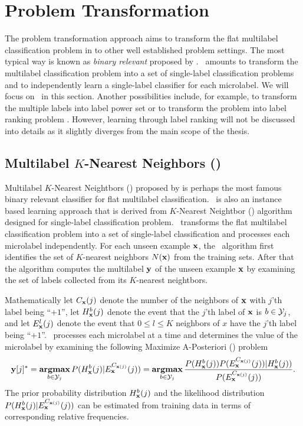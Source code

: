 {%
%
\section{Problem Transformation}

The problem transformation approach aims to transform the flat multilabel classification problem in to other well established problem settings.
The most typical way is known as \textit{binary relevant} proposed by \citet{Tsoumakas07multi,Tsoumakas10mining}.
\br\ amounts to transform the multilabel classification problem into a set of single-label classification problems and to independently learn a single-label classifier for each microlabel.
We will focus on \br\ in this section.
Another possibilities include, for example, to transform the multiple labels into label power set \citep{Tsoumakas07random} or to transform the problem into label ranking problem \citep{Elisseeff01akernel,Brinker07case,Furnkranz08multilabel,Chiang12a}.
However, learning through label ranking will not be discussed into details as it slightly diverges from the main scope of the thesis.



%
%
\subsection{Multilabel $K$-Nearest Neighbors (\mlknn)} \label{sc_mlknn}

Multilabel $K$-Nearest Neightbors (\mlknn) proposed by \citet{Zhang05a,Zhang07mlknn} is perhaps the most famous binary relevant classifier for flat multilabel classification.
\mlknn\ is also an instance based learning approach \citep{Aha91instance} that is derived from $K$-Nearest Neightbor (\knn) algorithm designed for single-label classification problem.
\mlknn\ transforms the flat multilabel classification problem into a set of single-label classification and processes each microlabel independently.
For each unseen example $\mathbf {x}$, the \mlknn\ algorithm first identifies the set of $K$-nearest neighbors $N(\mathbf {x})$ from the training sets.
After that the algorithm computes the multilabel $\mathbf {y}$ of the unseen example $\mathbf {x}$ by examining the set of labels collected from its $K$-nearest neightbors.

Mathematically 
let $C_{\mathbf {x}}(j)$ denote the number of the neighbors of $\mathbf {x}$ with $j$'th label being ``$+1$'',
let $H^b_{\mathbf {x}}(j)$ denote the event that the $j$'th label of $\mathbf {x}$ is $b\in\mathcal{Y}_j$,
and let $E_{\mathbf {x}}^l(j)$ denote the event that $0\le l \le K$ neighbors of $x$ have the $j$'th label being ``$+1$''.
\mlknn\ processes each microlabel at a time and determines the value of the microlabel by examining the following Maximize A-Posteriori (\map) problem
\begin{align*}
	\mathbf {y}[j]^* = \underset{b\in\mathcal{Y}_j}{\textbf{argmax}} \, P( H^b_{\mathbf {x}}(j) | E_{\mathbf {x}}^{C_{\mathbf {x}(j)}}(j) )
	= \underset{b\in\mathcal{Y}_j}{\textbf{argmax}} \, \frac{P( H^b_{\mathbf {x}}(j) ) P(  E_{\mathbf {x}}^{C_{\mathbf {x}(j)}}(j) ) | H^b_{\mathbf {x}}(j))}{P( E_{\mathbf {x}}^{C_{\mathbf {x}(j)}}(j))}.
\end{align*}
The prior probability distribution $H^b_{\mathbf {x}}(j)$ and the likelihood distribution $P( H^b_{\mathbf {x}}(j) | E_{\mathbf {x}}^{C_{\mathbf {x}(j)}}(j) )$ can be estimated from training data in terms of corresponding relative frequencies.

}
